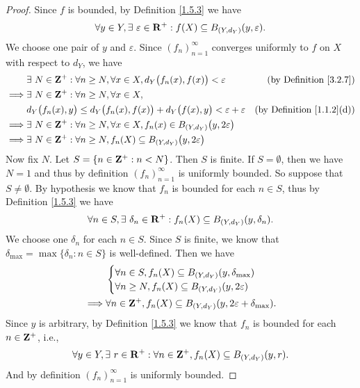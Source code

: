 \begin{proof}
    Since \(f\) is bounded, by Definition \ref{1.5.3} we have
    \[
        \forall y \in Y, \exists\ \varepsilon \in \mathbf{R}^+ : f(X) \subseteq B_{(Y, d_Y)}(y, \varepsilon).
    \]
    We choose one pair of \(y\) and \(\varepsilon\).
    Since \((f_n)_{n = 1}^\infty\) converges uniformly to \(f\) on \(X\) with respect to \(d_Y\), we have
    \begin{align*}
                 & \exists\ N \in \mathbf{Z}^+ : \forall n \geq N, \forall x \in X, d_Y\big(f_n(x), f(x)\big) < \varepsilon          & \text{(by Definition \ref{3.2.7})}    \\
        \implies & \exists\ N \in \mathbf{Z}^+ : \forall n \geq N, \forall x \in X,                                                                                          \\
                 & d_Y\big(f_n(x), y\big) \leq d_Y\big(f_n(x), f(x)\big) + d_Y\big(f(x), y\big) < \varepsilon + \varepsilon  & \text{(by Definition \ref{1.1.2}(d))} \\
        \implies & \exists\ N \in \mathbf{Z}^+ : \forall n \geq N, \forall x \in X, f_n(x) \in B_{(Y, d_Y)}\big(y, 2\varepsilon\big)                                         \\
        \implies & \exists\ N \in \mathbf{Z}^+ : \forall n \geq N, f_n(X) \subseteq B_{(Y, d_Y)}\big(y, 2\varepsilon\big)
    \end{align*}
    Now fix \(N\).
    Let \(S = \{n \in \mathbf{Z}^+ : n < N\}\).
    Then \(S\) is finite.
    If \(S = \emptyset\), then we have \(N = 1\) and thus by definition \((f_n)_{n = 1}^\infty\) is uniformly bounded.
    So suppose that \(S \neq \emptyset\).
    By hypothesis we know that \(f_n\) is bounded for each \(n \in S\), thus by Definition \ref{1.5.3} we have
    \[
        \forall n \in S, \exists\ \delta_n \in \mathbf{R}^+ : f_n(X) \subseteq B_{(Y, d_Y)}(y, \delta_n).
    \]
    We choose one \(\delta_n\) for each \(n \in S\).
    Since \(S\) is finite, we know that \(\delta_{\max} = \max\{\delta_n : n \in S\}\) is well-defined.
    Then we have
    \begin{align*}
                 & \begin{cases}
                       \forall n \in S, f_n(X) \subseteq B_{(Y, d_Y)}(y, \delta_{\max}) \\
                       \forall n \geq N, f_n(X) \subseteq B_{(Y, d_Y)}(y, 2\varepsilon)
                   \end{cases}                    \\
        \implies & \forall n \in \mathbf{Z}^+, f_n(X) \subseteq B_{(Y, d_Y)}(y, 2\varepsilon + \delta_{\max}).
    \end{align*}
    Since \(y\) is arbitrary, by Definition \ref{1.5.3} we know that \(f_n\) is bounded for each \(n \in \mathbf{Z}^+\), i.e.,
    \[
        \forall y \in Y, \exists\ r \in \mathbf{R}^+ : \forall n \in \mathbf{Z}^+, f_n(X) \subseteq B_{(Y, d_Y)}(y, r).
    \]
    And by definition \((f_n)_{n = 1}^\infty\) is uniformly bounded.
\end{proof}